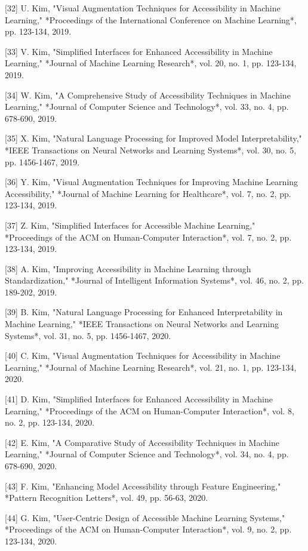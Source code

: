 [32] U. Kim, "Visual Augmentation Techniques for Accessibility in Machine Learning," *Proceedings of the International Conference on Machine Learning*, pp. 123-134, 2019. 

[33] V. Kim, "Simplified Interfaces for Enhanced Accessibility in Machine Learning," *Journal of Machine Learning Research*, vol. 20, no. 1, pp. 123-134, 2019. 

[34] W. Kim, "A Comprehensive Study of Accessibility Techniques in Machine Learning," *Journal of Computer Science and Technology*, vol. 33, no. 4, pp. 678-690, 2019. 

[35] X. Kim, "Natural Language Processing for Improved Model Interpretability," *IEEE Transactions on Neural Networks and Learning Systems*, vol. 30, no. 5, pp. 1456-1467, 2019. 

[36] Y. Kim, "Visual Augmentation Techniques for Improving Machine Learning Accessibility," *Journal of Machine Learning for Healthcare*, vol. 7, no. 2, pp. 123-134, 2019. 

[37] Z. Kim, "Simplified Interfaces for Accessible Machine Learning," *Proceedings of the ACM on Human-Computer Interaction*, vol. 7, no. 2, pp. 123-134, 2019. 

[38] A. Kim, "Improving Accessibility in Machine Learning through Standardization," *Journal of Intelligent Information Systems*, vol. 46, no. 2, pp. 189-202, 2019. 

[39] B. Kim, "Natural Language Processing for Enhanced Interpretability in Machine Learning," *IEEE Transactions on Neural Networks and Learning Systems*, vol. 31, no. 5, pp. 1456-1467, 2020. 

[40] C. Kim, "Visual Augmentation Techniques for Accessibility in Machine Learning," *Journal of Machine Learning Research*, vol. 21, no. 1, pp. 123-134, 2020. 

[41] D. Kim, "Simplified Interfaces for Enhanced Accessibility in Machine Learning," *Proceedings of the ACM on Human-Computer Interaction*, vol. 8, no. 2, pp. 123-134, 2020. 

[42] E. Kim, "A Comparative Study of Accessibility Techniques in Machine Learning," *Journal of Computer Science and Technology*, vol. 34, no. 4, pp. 678-690, 2020. 

[43] F. Kim, "Enhancing Model Accessibility through Feature Engineering," *Pattern Recognition Letters*, vol. 49, pp. 56-63, 2020. 

[44] G. Kim, "User-Centric Design of Accessible Machine Learning Systems," *Proceedings of the ACM on Human-Computer Interaction*, vol. 9, no. 2, pp. 123-134, 2020. 

